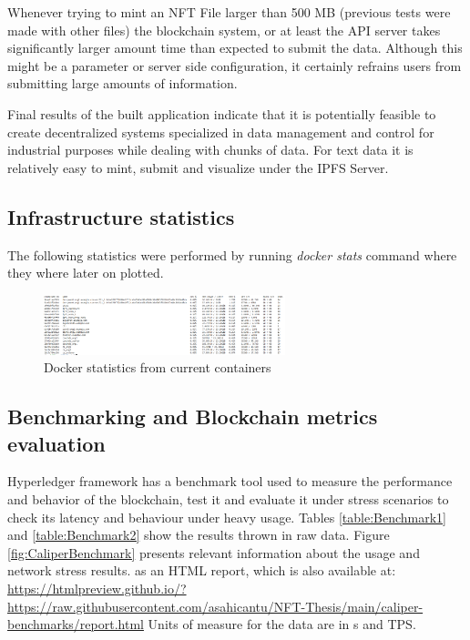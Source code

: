 \documentclass[a4paper]{article}
\begin{document}
Whenever trying to mint an NFT File larger than 500 MB (previous tests were made with other files) the blockchain system, or at least the API server takes significantly larger amount time than expected to submit the data. Although this might be a parameter or server side configuration, it certainly refrains users from submitting large amounts of information.

Final results of the built application indicate that it is potentially feasible to create decentralized systems specialized in data management and control for industrial purposes while dealing with chunks of data. For text data it is relatively easy to mint, submit and visualize under the IPFS Server.

\subsection{Infrastructure statistics}
The following statistics were performed by running \textit{docker stats} command where they where later on plotted.
\begin{figure}[ht]
        \centering
        \includegraphics[width=7cm]{img/Docker_Stats.png}
        \caption{Docker statistics from current containers}
        \label{fig:dockerStats}
\end{figure}

\subsection{Benchmarking and Blockchain metrics evaluation}
Hyperledger framework has a benchmark tool used to measure the performance and behavior of the blockchain, test it and evaluate it under stress scenarios to check its latency and behaviour under heavy usage. Tables \ref{table:Benchmark1} and \ref{table:Benchmark2} show the results thrown in raw data. Figure \ref{fig:CaliperBenchmark} presents relevant information about the usage and network stress results. as an HTML report, which is also available at:
\url{https://htmlpreview.github.io/?https://raw.githubusercontent.com/asahicantu/NFT-Thesis/main/caliper-benchmarks/report.html} Units of measure for the data are in s and TPS.
\end{document}

